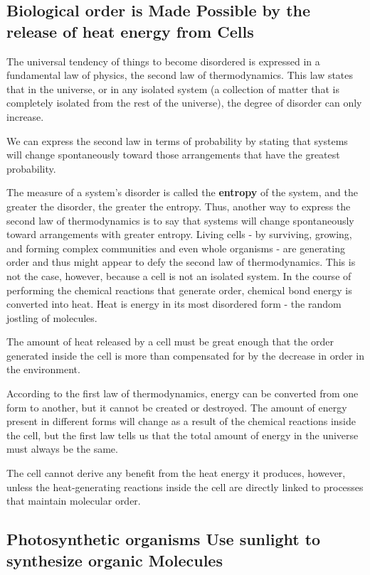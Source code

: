 \subsection{Biological order is Made Possible by the release of heat energy from Cells}

The universal tendency of things to become disordered is expressed in a
fundamental law of physics, the second law of thermodynamics. This law
states that in the universe, or in any isolated system (a collection of matter
that is completely isolated from the rest of the universe), the degree
of disorder can only increase.

We can express the second law in terms of probability by stating that
systems will change spontaneously toward those arrangements that have
the greatest probability.

The measure of a system’s disorder is called the \textbf{entropy} of the system,
and the greater the disorder, the greater the entropy. Thus, another way
to express the second law of thermodynamics is to say that systems will
change spontaneously toward arrangements with greater entropy.
Living cells - by surviving, growing, and forming complex communities and
even whole organisms - are generating order and thus might appear to
defy the second law of thermodynamics. This is not the case, however,
because a cell is not an isolated system.
In the course of performing the chemical reactions that generate
order, chemical bond energy is converted into heat. Heat is energy in its
most disordered form - the random jostling of molecules.

The amount of heat released by a cell must be great enough that the order
generated inside the cell is more than compensated for by the decrease
in order in the environment.

According to the first law of thermodynamics, energy can be converted from one form to
another, but it cannot be created or destroyed.
The amount of energy
present in different forms will change as a result of the chemical reactions
inside the cell, but the first law tells us that the total amount of
energy in the universe must always be the same.

The cell cannot derive any benefit from the heat energy it produces,
however, unless the heat-generating reactions inside the cell are directly
linked to processes that maintain molecular order.

\subsection{Photosynthetic organisms Use sunlight to synthesize organic Molecules}

